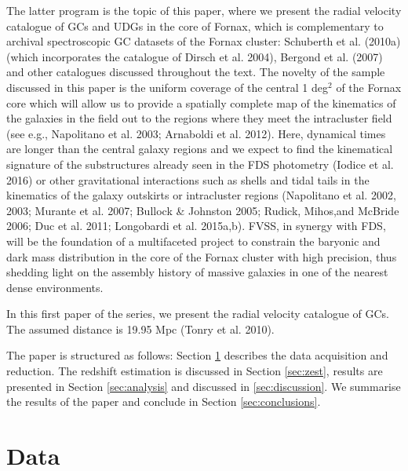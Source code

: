 \documentclass[useAMS,usenatbib]{mn2e}
\begin{document}
The latter program is the topic of this paper, where we present the radial 
velocity catalogue of GCs and UDGs in the core of Fornax, which is 
complementary to archival spectroscopic GC datasets of the Fornax cluster: 
Schuberth et al. (2010a) (which incorporates the catalogue of Dirsch et al. 
2004), Bergond et al. (2007) and other catalogues discussed throughout the 
text. The novelty of the sample discussed in this paper is the uniform coverage 
of the central 1 deg$^2$ of the Fornax core which will allow us to provide a 
spatially complete map of the kinematics of the galaxies in the field out to 
the regions where they meet the intracluster field (see e.g., Napolitano et al. 
2003; Arnaboldi et al. 2012). Here, dynamical times are longer than the central 
galaxy regions and we expect to find the kinematical signature of the 
substructures already seen in the FDS photometry (Iodice et al. 2016) or other 
gravitational interactions such as shells and tidal tails in the kinematics of 
the galaxy outskirts or intracluster regions (Napolitano et al. 2002, 2003; 
Murante et al. 2007; Bullock \& Johnston 2005; Rudick, Mihos,and McBride 2006; 
Duc et al. 2011; Longobardi et al. 2015a,b). FVSS, in synergy with FDS, will be 
the foundation of a multifaceted project to constrain the baryonic and dark 
mass distribution in the core of the Fornax cluster with high precision, thus 
shedding light on the assembly history of massive galaxies in one of the 
nearest dense environments.

In this first paper of the series, we present the radial velocity catalogue of 
GCs. 
The assumed distance is 19.95 Mpc (Tonry et al. 2010).

The paper is structured as follows: Section \ref{sec:data} describes the data 
acquisition and reduction. The redshift estimation is discussed in Section 
\ref{sec:zest}, results are presented in Section \ref{sec:analysis} and 
discussed in \ref{sec:discussion}. We summarise the results of the paper and 
conclude in Section \ref{sec:conclusions}. 

\section{Data}
\label{sec:data}
\end{document}
